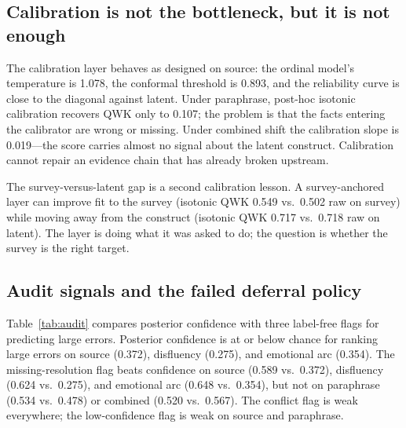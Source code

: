 \documentclass[11pt,a4paper]{article}
\begin{document}
\subsection{Calibration is not the bottleneck, but it is not enough}

The calibration layer behaves as designed on source: the ordinal model's temperature is 1.078,
the conformal threshold is 0.893, and the reliability curve is close to the diagonal against
latent. Under paraphrase, post-hoc isotonic calibration recovers QWK only to 0.107; the problem
is that the facts entering the calibrator are wrong or missing. Under combined shift the
calibration slope is 0.019---the score carries almost no signal about the latent construct.
Calibration cannot repair an evidence chain that has already broken upstream.

The survey-versus-latent gap is a second calibration lesson. A survey-anchored layer can improve
fit to the survey (isotonic QWK 0.549 vs.\ 0.502 raw on survey) while moving away from the
construct (isotonic QWK 0.717 vs.\ 0.718 raw on latent). The layer is doing what it was asked to
do; the question is whether the survey is the right target.

\subsection{Audit signals and the failed deferral policy}

Table~\ref{tab:audit} compares posterior confidence with three label-free flags for predicting
large errors. Posterior confidence is at or below chance for ranking large errors on source
(0.372), disfluency (0.275), and emotional arc (0.354). The missing-resolution flag beats
confidence on source (0.589 vs.\ 0.372), disfluency (0.624 vs.\ 0.275), and emotional arc
(0.648 vs.\ 0.354), but not on paraphrase (0.534 vs.\ 0.478) or combined (0.520 vs.\ 0.567).
The conflict flag is weak everywhere; the low-confidence flag is weak on source and paraphrase.
\end{document}
